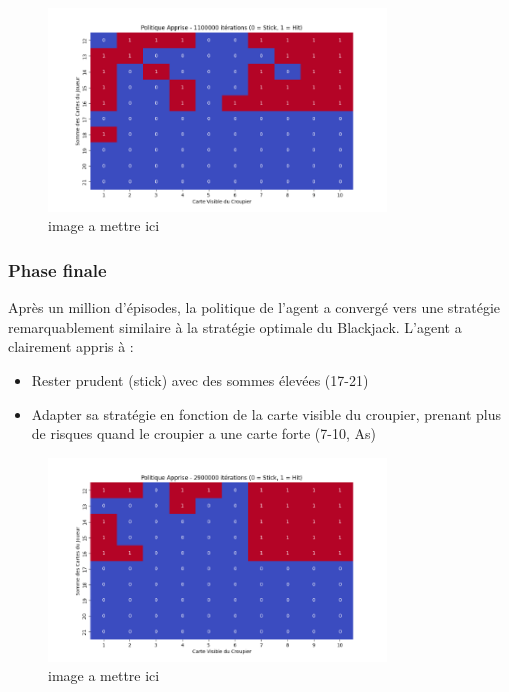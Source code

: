 \documentclass{article}
\begin{document}
    \begin{figure}[ht]
        \centering
        \includegraphics[width=0.8\textwidth]{2.png}
        \caption{image a mettre ici}
    \end{figure}

    \subsubsection{Phase finale}
    
    \quad Après un million d'épisodes, la politique de l'agent a convergé vers une stratégie remarquablement similaire à la stratégie optimale du Blackjack. L'agent a clairement appris à :
    \begin{itemize} 
        \item Rester prudent (stick) avec des sommes élevées (17-21)
        \item Adapter sa stratégie en fonction de la carte visible du croupier, prenant plus de risques quand le croupier a une carte forte (7-10, As)
    \end{itemize}

    \clearpage
    
    \begin{figure}[ht]
        \centering
        \includegraphics[width=0.8\textwidth]{3.png}
        \caption{image a mettre ici}
    \end{figure}
\end{document}
